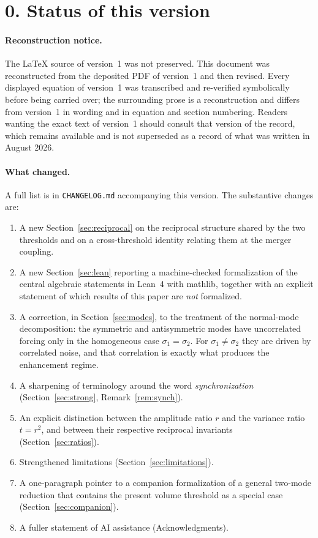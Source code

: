 \documentclass[11pt]{article}
\theoremstyle{plain}
\theoremstyle{remark}
\begin{document}
\section*{0. Status of this version}

\paragraph{Reconstruction notice.} The LaTeX source of version~1 was not preserved. This
document was reconstructed from the deposited PDF of version~1 and then revised. Every
displayed equation of version~1 was transcribed and re-verified symbolically before being
carried over; the surrounding prose is a reconstruction and differs from version~1 in wording
and in equation and section numbering. Readers wanting the exact text of version~1 should
consult that version of the record, which remains available and is not superseded as a record
of what was written in August 2026.

\paragraph{What changed.} A full list is in \texttt{CHANGELOG.md} accompanying this version.
The substantive changes are:

\begin{enumerate}\itemsep2pt
\item A new Section~\ref{sec:reciprocal} on the reciprocal structure shared by the two
  thresholds and on a cross-threshold identity relating them at the merger coupling.
\item A new Section~\ref{sec:lean} reporting a machine-checked formalization of the central
  algebraic statements in Lean~4 with mathlib, together with an explicit statement of which
  results of this paper are \emph{not} formalized.
\item A correction, in Section~\ref{sec:modes}, to the treatment of the normal-mode
  decomposition: the symmetric and antisymmetric modes have uncorrelated forcing only in the
  homogeneous case $\sigma_1=\sigma_2$. For $\sigma_1\neq\sigma_2$ they are driven by
  correlated noise, and that correlation is exactly what produces the enhancement regime.
\item A sharpening of terminology around the word \emph{synchronization}
  (Section~\ref{sec:strong}, Remark~\ref{rem:synch}).
\item An explicit distinction between the amplitude ratio $r$ and the variance ratio $t=r^2$,
  and between their respective reciprocal invariants (Section~\ref{sec:ratios}).
\item Strengthened limitations (Section~\ref{sec:limitations}).
\item A one-paragraph pointer to a companion formalization of a general two-mode reduction
  that contains the present volume threshold as a special case
  (Section~\ref{sec:companion}).
\item A fuller statement of AI assistance (Acknowledgments).
\end{enumerate}
\end{document}
